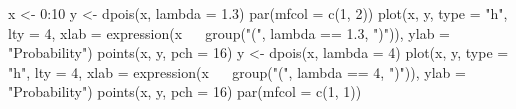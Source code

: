 \begin{Schunk}
\begin{Sinput}
 x <- 0:10
 y <- dpois(x, lambda = 1.3)
 par(mfcol = c(1, 2))
 plot(x, y, type = "h", lty = 4, xlab = expression(x ~ ~group("(", lambda == 
      1.3, ")")), ylab = "Probability")
 points(x, y, pch = 16)
 y <- dpois(x, lambda = 4)
 plot(x, y, type = "h", lty = 4, xlab = expression(x ~ ~group("(", lambda == 
      4, ")")), ylab = "Probability")
 points(x, y, pch = 16)
 par(mfcol = c(1, 1))
\end{Sinput}
\end{Schunk}

